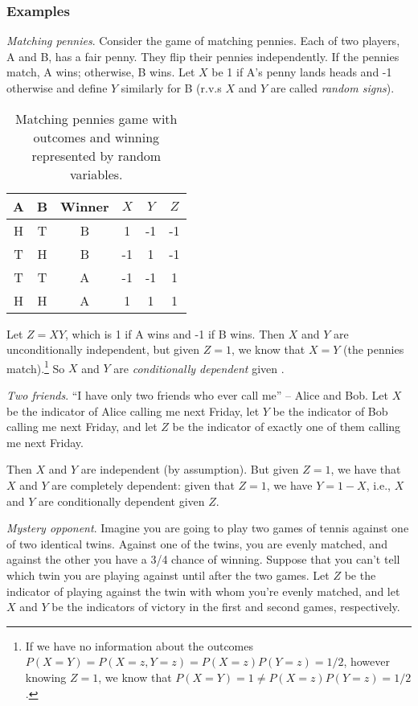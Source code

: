 \documentclass[11pt,a4paper]{article}
\begin{document}
\subsubsection{Examples}

\emph{Matching pennies}. 
Consider the game of matching pennies. 
Each of two players, A and B, has a fair penny. 
They flip their pennies independently. 
If the pennies match, A wins; otherwise, B wins. 
Let \(X\) be 1 if A's penny lands heads and -1 otherwise 
and define \(Y\) similarly for B (r.v.s \(X\) and \(Y\) are called \emph{random signs}).

\begin{table}[h!]
\centering
\begin{tabular}{| c | c | c | c | c | c |}
\hline
A & B & Winner & \(X\) & \(Y\) & \(Z\) \\\hline
H & T & B & 1 & -1 & -1 \\\hline
T & H & B & -1 & 1 & -1 \\\hline
T & T & A & -1 & -1 & 1 \\\hline
H & H & A & 1 & 1 & 1 \\\hline
\end{tabular}
\caption{%
Matching pennies game with outcomes and winning represented by random variables.
}
\end{table}

Let \(Z = XY\), which is 1 if A wins and -1 if B wins. Then \(X\) and
\(Y\) are unconditionally independent, but given \(Z = 1\), we know that
\(X = Y\) (the pennies match).\footnote{If we have no information about
  the outcomes \(P(X = Y) = P(X = z,Y = z) = P(X = z)P(Y = z) = 1/2\),
  however knowing \(Z = 1\), we know that
  \(P(X = Y) = 1 \neq P(X = z)P(Y = z) = 1/2\).} So \(X\) and \(Y\) are
\emph{conditionally dependent} given \(\).

\emph{Two friends}. ``I have only two friends who ever call me'' 
-- Alice and Bob. 
Let \(X\) be the indicator of Alice calling me next Friday, 
let \(Y\) be the indicator of Bob calling me next Friday, 
and let \(Z\) be the indicator of exactly one of them calling me next Friday.

Then \(X\) and \(Y\) are independent (by assumption). 
But given \(Z = 1\), 
we have that \(X\) and \(Y\) are completely dependent:
given that \(Z = 1\), 
we have \(Y = 1 - X\), i.e., \(X\) and \(Y\) are conditionally dependent given \(Z\).

\emph{Mystery opponent}. 
Imagine you are going to play two games of tennis against one of two identical twins. 
Against one of the twins, you are evenly matched, 
and against the other you have a 3/4 chance of winning. 
Suppose that you can't tell which twin you are playing against until after the two games. 
Let \(Z\) be the indicator of playing against the twin 
with whom you're evenly matched, 
and let \(X\) and \(Y\) be the indicators of victory in the first and second games, respectively.
\end{document}

